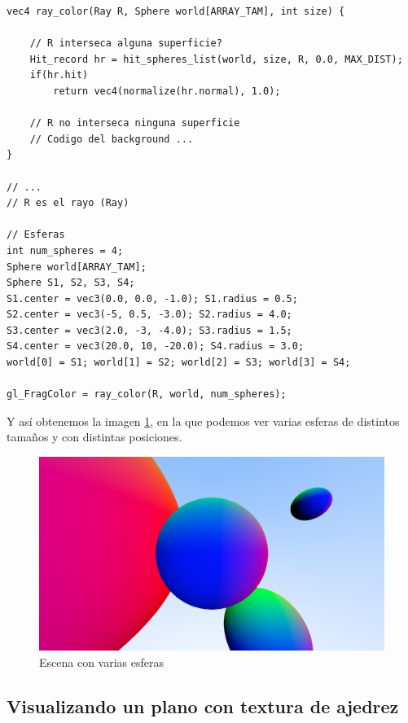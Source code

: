 \begin{lstlisting}
vec4 ray_color(Ray R, Sphere world[ARRAY_TAM], int size) {

    // R interseca alguna superficie?
    Hit_record hr = hit_spheres_list(world, size, R, 0.0, MAX_DIST);
    if(hr.hit)
        return vec4(normalize(hr.normal), 1.0);

    // R no interseca ninguna superficie
    // Codigo del background ... 
}

// ... 
// R es el rayo (Ray)

// Esferas
int num_spheres = 4;
Sphere world[ARRAY_TAM];
Sphere S1, S2, S3, S4;
S1.center = vec3(0.0, 0.0, -1.0); S1.radius = 0.5; 
S2.center = vec3(-5, 0.5, -3.0); S2.radius = 4.0;
S3.center = vec3(2.0, -3, -4.0); S3.radius = 1.5;
S4.center = vec3(20.0, 10, -20.0); S4.radius = 3.0;
world[0] = S1; world[1] = S2; world[2] = S3; world[3] = S4;

gl_FragColor = ray_color(R, world, num_spheres);

\end{lstlisting}

Y así obtenemos la imagen \ref{fig:varias-esferas}, en la que podemos ver varias esferas de distintos tamaños y con distintas posiciones.

\begin{figure} [ht]
    \centering
    \includegraphics[scale = 0.25]{img/C8/varias-esferas.png}
    \caption{Escena con varias esferas}
    \label{fig:varias-esferas}
\end{figure}

\subsection{Visualizando un plano con textura de ajedrez}
\label{subsection:plano}

